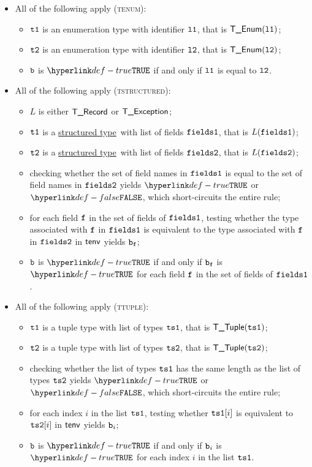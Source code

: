 \documentclass{book}
\newcommand\ProseOrTypeError[0]{\ProseTerminateAs{\TypeErrorConfig}}
\newcommand\structuredtype[0]{\hyperlink{def-structuredtype}{structured type}}
\begin{document}
\begin{itemize}
  \item All of the following apply (\textsc{tenum}):
  \begin{itemize}
    \item $\texttt{t1}$ is an enumeration type with identifier $\texttt{l1}$, that is $\textsf{T\_Enum}(\texttt{l1})$;
    \item $\texttt{t2}$ is an enumeration type with identifier $\texttt{l2}$, that is $\textsf{T\_Enum}(\texttt{l2})$;
    \item $\texttt{b}$ is $\True$ if and only if $\texttt{l1}$ is equal to $\texttt{l2}$.
  \end{itemize}

  \item All of the following apply (\textsc{tstructured}):
  \begin{itemize}
    \item $L$ is either $\textsf{T\_Record}$ or $\textsf{T\_Exception}$;
    \item $\texttt{t1}$ is a \structuredtype\ with list of fields $\texttt{fields1}$, that is $L(\texttt{fields1})$;
    \item $\texttt{t2}$ is a \structuredtype\ with list of fields $\texttt{fields2}$, that is $L(\texttt{fields2})$;
    \item checking whether the set of field names in $\texttt{fields1}$ is equal to the set of field names in $\texttt{fields2}$
          yields $\True$ or $\False$, which short-circuits the entire rule;
    \item for each field $\texttt{f}$ in the set of fields of $\texttt{fields1}$, testing whether the type associated with
          $\texttt{f}$ in $\texttt{fields1}$ is equivalent to the type associated with
          $\texttt{f}$ in $\texttt{fields2}$ in $\textsf{tenv}$ yields $\texttt{b}_{\texttt{f}}$\ProseOrTypeError;
    \item $\texttt{b}$ is $\True$ if and only if $\texttt{b}_{\texttt{f}}$ is $\True$ for each field $\texttt{f}$ in the set of fields of $\texttt{fields1}$.
  \end{itemize}

  \item All of the following apply (\textsc{ttuple}):
  \begin{itemize}
    \item $\texttt{t1}$ is a tuple type with list of types $\texttt{ts1}$, that is $\textsf{T\_Tuple}(\texttt{ts1})$;
    \item $\texttt{t2}$ is a tuple type with list of types $\texttt{ts2}$, that is $\textsf{T\_Tuple}(\texttt{ts2})$;
    \item checking whether the list of types $\texttt{ts1}$ has the same length as the list of types $\texttt{ts2}$ yields $\True$
          or $\False$, which short-circuits the entire rule;
    \item for each index $i$ in the list $\texttt{ts1}$, testing whether $\texttt{ts1}[i]$ is equivalent to $\texttt{ts2}[i]$ in $\textsf{tenv}$
          yields $\texttt{b}_i$\ProseOrTypeError;
    \item $\texttt{b}$ is $\True$ if and only if $\texttt{b}_i$ is $\True$ for each index $i$ in the list $\texttt{ts1}$.
  \end{itemize}
\end{itemize}
\end{document}
